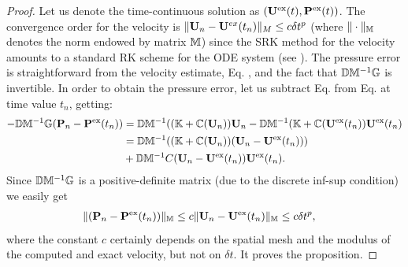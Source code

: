 \begin{proof}
Let us denote the time-continuous solution as $({\bf U}^{\rm ex}(t),{\bf P}^{\rm ex}(t))$. The convergence order for the velocity is $\| {\bf U}_n - {\bf U}^{ex}(t_n)\|_{M} \leq c \delta t^{p}$ (where $\| \cdot \|_{\mathbb{M}}$ denotes the norm endowed by matrix $\mathbb{M}$) since the SRK method for the velocity amounts to a standard RK scheme for the ODE system  (see \cite{hairer_solving_2008}). The pressure error is straightforward from the velocity estimate, Eq. , and the fact that $\mathbb{D}\mathbb{M}^{-1}\mathbb{G}$ is invertible. 
In order to obtain the pressure error, let us subtract Eq.  from Eq.  at time value $t_n$, getting:
\begin{align*}
- \mathbb{D}\mathbb{M}^{-1}\mathbb{G}({\bf P}_{n} - {\bf P}^{\rm ex}(t_{n}))& = \mathbb{D}\mathbb{M}^{-1}((\mathbb{K}+\mathbb{C}({\bf U}_{n})){\bf U}_{n} - \mathbb{D}\mathbb{M}^{-1}(\mathbb{K}+\mathbb{C}({\bf U}^{\rm ex}(t_{n})){\bf U}^{\rm ex}(t_{n}) \\
 & = \mathbb{D}\mathbb{M}^{-1}((\mathbb{K}+\mathbb{C}({\bf U}_{n}))({\bf U}_{n} - {\bf U}^{\rm ex}(t_{n}))) \\
 &+ \mathbb{D}\mathbb{M}^{-1}C({\bf U}_{n} - {\bf U}^{\rm ex}(t_{n})){\bf U}^{\rm ex}(t_{n}).
\end{align*}
Since $\mathbb{D}\mathbb{M}^{-1}\mathbb{G}$ is a positive-definite matrix (due to the discrete inf-sup condition) we easily get
\begin{align*}
\| ({\bf P}_{n} - {\bf P}^{\rm ex}(t_{n}))\|_{\mathbb{M}} &  \leq c \| {\bf U}_{n} - {\bf U}^{\rm ex}(t_{n}) \|_{\mathbb{M}} \leq c \delta t^{p},
\end{align*}
where the constant $c$ certainly depends on the spatial mesh and the modulus of the computed and exact velocity, but not on $\delta t$. It proves the proposition.
%
%
%
%
\end{proof}



